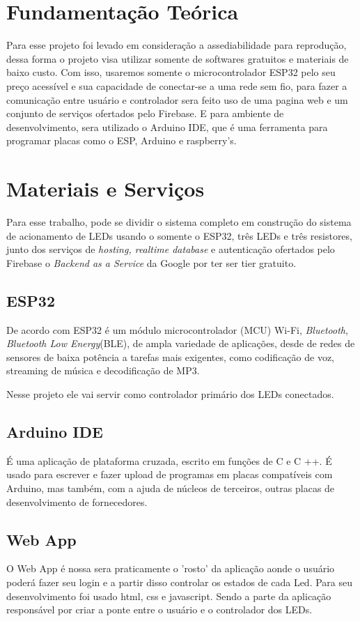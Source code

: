 \documentclass[12pt]{article}
\begin{document}
\section{Fundamentação Teórica}
Para esse projeto foi levado em consideração a assediabilidade para reprodução, dessa forma o projeto visa utilizar somente de softwares gratuitos e materiais de baixo custo.
Com isso, usaremos somente o microcontrolador ESP32 pelo seu preço acessível e sua capacidade de conectar-se a uma rede sem fio, para fazer a comunicação entre usuário e
controlador sera feito uso de uma pagina web e um conjunto de serviços ofertados pelo Firebase. E para ambiente de desenvolvimento,
sera utilizado o Arduino IDE, que é uma ferramenta para programar placas como o ESP, Arduino e raspberry's.

\section{Materiais e Serviços}
Para esse trabalho, pode se dividir o sistema completo em construção do sistema de acionamento de LEDs usando o somente o ESP32, três LEDs e três resistores,
junto dos serviços de \emph{hosting, realtime database} e autenticação ofertados pelo Firebase o \emph{Backend as a Service} da Google por ter ser tier gratuito.

\subsection{ESP32}
De acordo com \cite{EXPRESSIF} ESP32 é um módulo microcontrolador (MCU) Wi-Fi, \emph{Bluetooth}, \emph{Bluetooth Low Energy}(BLE), de ampla variedade de aplicações,
desde de redes de sensores de baixa potência a tarefas mais exigentes, como codificação de voz, streaming de música e decodificação de MP3.

Nesse projeto ele vai servir como controlador primário dos LEDs conectados.

\subsection{Arduino IDE}
É uma aplicação de plataforma cruzada, escrito em funções de C e C ++. É usado para escrever e fazer upload de
programas em placas compatíveis com Arduino, mas também, com a ajuda de núcleos de terceiros, outras placas de
desenvolvimento de fornecedores.

\subsection{Web App}
O Web App é nossa sera praticamente o 'rosto' da aplicação aonde o usuário poderá fazer seu login e a partir disso controlar os estados de cada Led.
Para seu desenvolvimento foi usado html, css e javascript. Sendo a parte da aplicação responsável por criar a ponte entre o usuário e o controlador dos LEDs.
\end{document}
